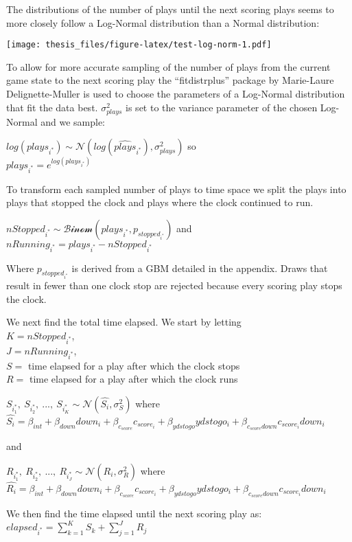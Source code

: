 \documentclass[12pt,twoside]{dukestatscithesis}
\begin{document}
The distributions of the number of plays until the next scoring plays seems to more closely follow a Log-Normal distribution than a Normal distribution:

\texttt{[image: thesis\_files/figure-latex/test-log-norm-1.pdf]}

To allow for more accurate sampling of the number of plays from the current game state to the next scoring play the ``fitdistrplus'' package by Marie-Laure Delignette-Muller is used to choose the parameters of a Log-Normal distribution that fit the data best. \(\sigma^{2}_{plays}\) is set to the variance parameter of the chosen Log-Normal and we sample:

\(log(plays_{i^*}) \sim \mathcal{N}(log(\hat{plays}_{i^*}),\sigma_{plays}^{2})\) so\\
\(plays_{i^*} = e^{log(plays_{i^*})}\)

To transform each sampled number of plays to time space we split the plays into plays that stopped the clock and plays where the clock continued to run.

\(nStopped_{i^*} \sim \mathcal{Binom}(plays_{i^*}, p_{stopped_{i^*}})\) and\\
\(nRunning_{i^*} = plays_{i^*} - nStopped_{i^*}\)

Where \(p_{stopped_{i^*}}\) is derived from a GBM detailed in the appendix. Draws that result in fewer than one clock stop are rejected because every scoring play stops the clock.

We next find the total time elapsed. We start by letting\\
\(K = nStopped_{i^*}\),\\
\(J = nRunning_{i^*}\),\\
\(S =\) time elapsed for a play after which the clock stops\\
\(R =\) time elapsed for a play after which the clock runs

\(S_{i^*_{1}}, \: S_{i^*_{2}}, \: ... , \: S_{i^*_{K}} \sim \mathcal{N}(\hat{S_i},\sigma_{S}^{2})\) where
\(\hat{S_i} = \beta_{int} + \beta_{down}down_i + \beta_{c_{score}}c_{score_i} + \beta_{ydstogo}ydstogo_i + \beta_{c_{score}down}c_{score_i}down_i\)

and

\(R_{i^*_{1}}, \: R_{i^*_{2}}, \: ... , \: R_{i^*_{J}} \sim \mathcal{N}(\hat{R_i},\sigma_{R}^{2})\) where
\(\hat{R_i} = \beta_{int} + \beta_{down}down_i + \beta_{c_{score}}c_{score_i} + \beta_{ydstogo}ydstogo_i + \beta_{c_{score}down}c_{score_i}down_i\)

We then find the time elapsed until the next scoring play as:\\
\(elapsed_{i^*} = \sum_{k=1}^{K}S_k + \sum_{j=1}^{J}R_j\)
\end{document}
